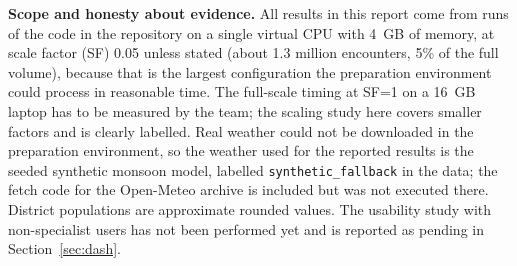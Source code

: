 \textbf{Scope and honesty about evidence.} All results in this report come from runs of the code in the repository on a single virtual CPU with 4~GB of memory, at scale factor (SF) 0.05 unless stated (about 1.3 million encounters, 5\% of the full volume), because that is the largest configuration the preparation environment could process in reasonable time. The full-scale timing at SF=1 on a 16~GB laptop has to be measured by the team; the scaling study here covers smaller factors and is clearly labelled. Real weather could not be downloaded in the preparation environment, so the weather used for the reported results is the seeded synthetic monsoon model, labelled \texttt{synthetic\_fallback} in the data; the fetch code for the Open-Meteo archive is included but was not executed there. District populations are approximate rounded values. The usability study with non-specialist users has not been performed yet and is reported as pending in Section~\ref{sec:dash}.
